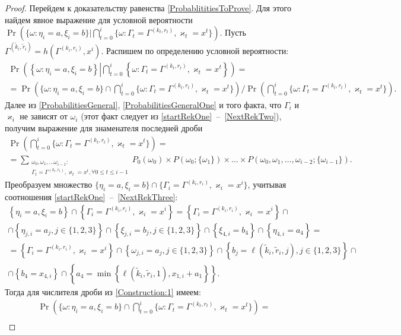 \documentclass[a4paper,12pt,russian]{extarticle}
\newcommand{\ga}[1]{\Gamma^{\left( #1 \right)} }
\newcommand{\ml}[1]{\begin{multline}#1\end{multline}}
\newcommand{\mll}[1]{\begin{multline*}#1\end{multline*}}
\begin{document}
\begin{proof}
Перейдем к доказательству равенства \eqref{ProbablititiesToProve}. Для этого найдем явное выражение для условной вероятности $\Pr (\{ \omega \colon \eta_i = a, \xi_i=b\} | \bigcap_{t=0}^{i}\{\omega\colon \Gamma_t=\ga{k_t,r_t}, \varkappa_t=x^t\})$. Пусть $\ga{\tilde{k}_i,\tilde{r}_i}=h(\ga{k_i,r_i},x^i)$. Распишем по определению условной вероятности:
\ml
{
\Pr \left(\left\{ \omega \colon \eta_i = a, \xi_i=b\right\}  \left| \bigcap_{t=0}^{i}\left\{\omega\colon \Gamma_t=\ga{k_t,r_t}, \varkappa_t=x^t\right\}\right.\right) = \\
=\Pr\left(\{ \omega \colon \eta_i = a, \xi_i=b \} \cap \bigcap_{t=0}^{i}\{\omega\colon \Gamma_t=\ga{k_t,r_t}, \varkappa_t=x^t\}\right) \Big/
\Pr\left( \bigcap_{t=0}^{i}\{\omega\colon \Gamma_t=\ga{k_t,r_t}, \varkappa_t=x^t\}\right).
\label{Construction:1}
}
Далее из \eqref{ProbabilitiesGeneral}, \eqref{ProbabilitiesGeneralOne} и того факта, что $\Gamma_i$ и $\varkappa_{i}$ не зависят от $\omega_i$ (этот факт следует из \eqref{startRekOne}~--~\eqref{NextRekTwo}), получим выражение для знаменателя последней дроби
\ml
{
\Pr\left( \bigcap_{t=0}^{i}\{\omega\colon \Gamma_t=\ga{k_t,r_t}, \varkappa_t=x^t\}\right)=\\
=\sum_{\substack{\omega_0, \omega_1,\ldots \omega_{i-1} \colon \\ \Gamma_t=\ga{k_t,r_t}, \varkappa_t=x^t, \forall 0\leqslant t \leqslant i-1}} P_0(\omega_0)\times P(\omega_0;\{\omega_1\})\times\ldots\times P(\omega_0,\omega_1,\ldots, \omega_{i-2};\{\omega_{i-1}\}).
\label{Construction:2}
}
Преобразуем множество $\{ \eta_i = a, \xi_i=b \} \cap \{\Gamma_i=\ga{k_i,r_i}, \varkappa_i=x^i\}$, учитывая соотношения \eqref{startRekOne}~--~\eqref{NextRekThree}:
\mll
{
\left\{ \eta_i = a, \xi_i=b \right\} \cap \left\{\Gamma_i=\ga{k_i,r_i}, \varkappa_i=x^i\right\} = \left\{\Gamma_i=\ga{k_i,r_i}, \varkappa_i=x^i\right\} \cap\\
\cap \left\{ \eta_{j,i} = a_j, j\in \{1, 2, 3\}\right\} \cap \left\{ \xi_{j,i} = b_j, j\in \{1, 2, 3\}\right\} \cap \left\{ \xi_{4,i} = b_4 \right\} \cap  \left\{ \eta_{4,i} = a_4 \right\} = \\
= \left\{\Gamma_i=\ga{k_i,r_i}, \varkappa_i=x^i\right\} \cap \left\{ \omega_{j,i} = a_j, j\in \{1, 2, 3\}\right\} \cap \left\{ b_j=\ell(\tilde{k}_i,\tilde{r}_i,j), j\in \{1, 2, 3\}\right\} \cap \\ 
\cap \left\{ b_4 = x_{4,i} \right\} \cap  \left\{ a_4=\min\left\{\ell(\tilde{k}_i,\tilde{r}_i,1), x_{1,i}+a_1\right\} \right\}. 
}
Тогда для числителя дроби из \eqref{Construction:1} имеем:
\ml
{
\Pr\left(\{ \omega \colon \eta_i = a, \xi_i=b \} \cap \bigcap_{t=0}^{i}\{\omega\colon \Gamma_t=\ga{k_t,r_t}, \varkappa_t=x^t\}\right)=\\
}
\end{proof}
\end{document}
